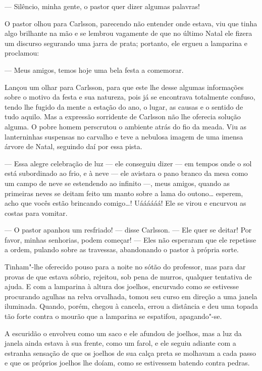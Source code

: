 --- Silêncio, minha gente, o pastor quer dizer algumas palavras!

O pastor olhou para Carlsson, parecendo não entender onde estava, viu que tinha
algo brilhante na mão e se lembrou vagamente de que no último Natal ele fizera um
discurso segurando uma jarra de prata; portanto, ele ergueu a lamparina e
proclamou:

--- Meus amigos, temos hoje uma bela festa a comemorar.

Lançou um olhar para Carlsson, para que este lhe desse algumas informações
sobre o motivo da festa e sua natureza, pois já se encontrava totalmente confuso,
tendo lhe fugido da mente a estação do ano, o lugar, as causas e o sentido
de tudo aquilo. Mas a expressão sorridente de Carlsson não lhe oferecia solução
alguma. O pobre homem perscrutou o ambiente atrás do fio da meada. Viu as
lanterninhas suspensas no carvalho e teve a nebulosa imagem de uma imensa
árvore de Natal, seguindo daí por essa pista.

--- Essa alegre celebração de luz --- ele conseguiu dizer --- em tempos onde o sol
está subordinado ao frio, e à neve --- ele avistara o pano branco da mesa como um
campo de neve se estendendo ao infinito ---, meus amigos, quando as primeiras
neves se deitam feito um manto sobre a lama do outono\ldots{} esperem, acho que
vocês estão brincando comigo\ldots{}! Uáááááá! Ele se virou e encurvou as costas 
para vomitar.

--- O pastor apanhou um resfriado! --- disse Carlsson. --- Ele quer se deitar! Por
favor, minhas senhorias, podem começar! --- Eles não esperaram que ele repetisse a ordem,
pulando sobre as travessas, abandonando o pastor à própria sorte.

Tinham"-lhe oferecido pouso para a noite no sótão do professor, mas
para dar provas de que estava sóbrio, rejeitou, sob pena de murros,
qualquer tentativa de ajuda. E com a lamparina à altura dos joelhos, encurvado
como se estivesse procurando agulhas na relva orvalhada, tomou seu curso em
direção a uma janela iluminada. Quando, porém, chegou à cancela, errou a
distância e deu uma topada tão forte contra o mourão que a lamparina se
espatifou, apagando"-se. 

A escuridão o envolveu como um saco e ele
afundou de joelhos, mas a luz da janela ainda estava à sua frente, como um
farol, e ele seguiu adiante com a estranha sensação de que os joelhos de sua
calça preta se molhavam a cada passo e que os próprios joelhos lhe doíam, como
se estivessem batendo contra pedras. 

